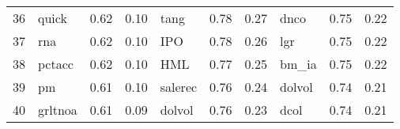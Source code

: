 \documentclass[12pt]{article}
\begin{document}
\begin{landscape}
\begin{footnotesize}
\begin{longtable}{l|lcc|lcc|lcc}
			36                    & quick                       & 0.62                                                                                 & 0.10                            & tang                        & 0.78                                                                                 & 0.27                            & dnco                        & 0.75                                                                                 & 0.22                           \\
			37                    & rna                         & 0.62                                                                                 & 0.10                            & IPO                         & 0.78                                                                                 & 0.26                            & lgr                         & 0.75                                                                                 & 0.22                           \\
			38                    & pctacc                      & 0.62                                                                                 & 0.10                            & HML                         & 0.77                                                                                 & 0.25                            & bm\_ia                      & 0.75                                                                                 & 0.22                           \\
			39                    & pm                          & 0.61                                                                                 & 0.10                            & salerec                     & 0.76                                                                                 & 0.24                            & dolvol                      & 0.74                                                                                 & 0.21                           \\
			40                    & grltnoa                     & 0.61                                                                                 & 0.09                            & dolvol                      & 0.76                                                                                 & 0.23                            & dcol                        & 0.74                                                                                 & 0.21                           \\

\end{longtable}
\end{footnotesize}
\end{landscape}
\end{document}
